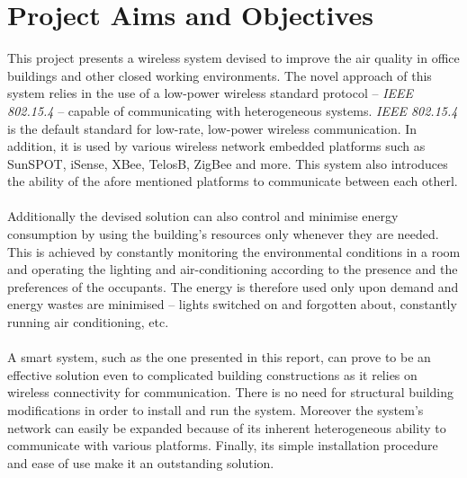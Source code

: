 \documentclass[12pt,a4paper,draft]{report}
\begin{document}
\section{Project Aims and Objectives}
This project presents a wireless system devised to improve the air quality in office buildings and other closed working environments. The novel approach of this system relies in the use of a low-power wireless standard protocol -- \textit{IEEE 802.15.4} -- capable of communicating with heterogeneous systems. \textit{IEEE 802.15.4} is the default standard for low-rate, low-power wireless communication. In addition, it is used by various wireless network embedded platforms such as SunSPOT, iSense, XBee, TelosB, ZigBee and more. This system also introduces the ability of the afore mentioned platforms to communicate between each otherl.\\
\ \\   
Additionally the devised solution can also control and minimise energy consumption by using the building's resources only whenever they are needed.
This is achieved by constantly monitoring the environmental conditions in a room and operating the lighting and air-conditioning according to the presence and the preferences of the occupants. 
The energy is therefore used only upon demand and energy wastes are minimised -- lights switched on and forgotten about, constantly running air conditioning, etc.\\
\ \\
A smart system, such as the one presented in this report, can prove to be an effective solution even to complicated building constructions as it relies on wireless connectivity for communication. 
There is no need for structural building modifications in order to install and run the system.
Moreover the system's network can easily be expanded because of its inherent heterogeneous ability to communicate with various platforms. 
Finally, its simple installation procedure and ease of use make it an outstanding solution.
%
\end{document}
